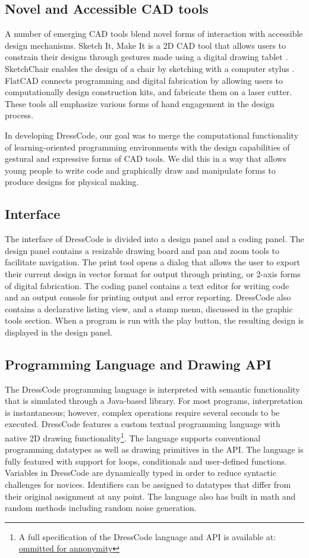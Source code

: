 \documentclass{sigchi}
\begin{document}
\subsection{Novel and Accessible CAD tools}
A number of emerging CAD tools blend novel forms of interaction with accessible design mechanisms. Sketch It, Make It is a 2D CAD tool that allows users to constrain their designs through gestures made using a digital drawing tablet \cite{sketchit}. SketchChair enables the design of a chair by sketching with a computer stylus \cite{sketchchair}. FlatCAD connects programming and digital fabrication by allowing users to computationally design construction kits, and fabricate them on a laser cutter\cite{flatcad}. These tools all emphasize various forms of hand engagement in the design process.

In developing DressCode, our goal was to merge the computational functionality of learning-oriented programming environments with the design capabilities of gestural and expressive forms of CAD tools. We did this in a way that allows young people to write code and graphically draw and manipulate forms to produce designs for physical making. 

\subsection{Interface}
The interface of DressCode is divided into a design panel and a coding panel. The design panel contains a resizable drawing board and pan and zoom tools to facilitate navigation. The print tool opens a dialog that allows the user to export their current design in vector format for output through printing, or 2-axis forms of digital fabrication. The coding panel contains a text editor for writing code and an output console for printing output and error reporting. DressCode also contains a declarative listing view, and a stamp menu, discussed in the graphic tools section. When a program is run with the play button, the resulting design is displayed in the design panel.

\subsection{Programming Language and Drawing API}
The DressCode programming language is interpreted with semantic functionality that is simulated through a Java-based library. For most programs, interpretation is instantaneous; however, complex operations require several seconds to be executed. DressCode features a custom textual programming language with native 2D drawing functionality\footnote{A full specification of the DressCode language and API is available at: \url{ommitted for annonymity}}. The language supports conventional programming datatypes as well as drawing primitives in the API. The language is fully featured with support for loops, conditionals and user-defined functions. Variables in DressCode are dynamically typed in order to reduce syntactic challenges for novices. Identifiers can be assigned to datatypes that differ from their original assignment at any point. The language also has built in math and random methods including random noise generation.
\end{document}

